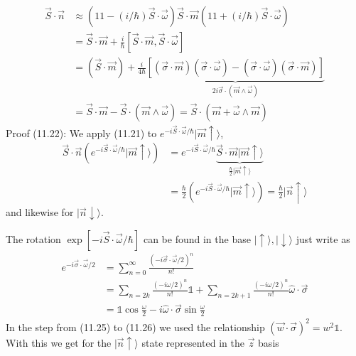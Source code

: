 \begin{equation}
\begin{aligned} \vec{S} \cdot \vec{n} & \approx(11-(i / \hbar) \vec{S} \cdot \vec{\omega}) \vec{S} \cdot \vec{m}(11+(i / \hbar) \vec{S} \cdot \vec{\omega}) \\ &=\vec{S} \cdot \vec{m}+\frac{i}{\hbar}[\vec{S} \cdot \vec{m}, \vec{S} \cdot \vec{\omega}] \\ &=(\vec{S} \cdot \vec{m})+\frac{i}{4 \hbar} \underbrace{[(\vec{\sigma} \cdot \vec{m})(\vec{\sigma} \cdot \vec{\omega})-(\vec{\sigma} \cdot \vec{\omega})(\vec{\sigma} \cdot \vec{m})]}_{2 i \vec{\sigma} \cdot(\vec{m} \wedge \vec{\omega})} \\ &=\vec{S} \cdot \vec{m}-\vec{S} \cdot(\vec{m} \wedge \vec{\omega})=\vec{S} \cdot(\vec{m}+\vec{\omega} \wedge \vec{m}) \end{aligned}
\end{equation}
Proof (11.22): We apply (11.21) to $e^{-i \vec{S} \cdot \vec{\omega} / \hbar}|\vec{m} \uparrow\rangle$,
\begin{equation}
\begin{aligned} \vec{S} \cdot \vec{n}\left(e^{-i \vec{S} \cdot \vec{\omega} / \hbar}|\vec{m} \uparrow\rangle\right) &=e^{-i \vec{S} \cdot \vec{\omega} / \hbar} \underbrace{\vec{S} \cdot \vec{m}|\vec{m} \uparrow\rangle}_{\frac{\hbar}{2}|\vec{m} \uparrow\rangle} \\ &=\frac{\hbar}{2}\left(e^{-i \vec{S} \cdot \vec{\omega} / \hbar}|\vec{m} \uparrow\rangle\right)=\frac{\hbar}{2}|\vec{n} \uparrow\rangle \end{aligned}
\end{equation}
and likewise for $|\vec{n}\downarrow\rangle$.\par
The rotation $\exp [-i \vec{S} \cdot \vec{\omega} / \hbar]$ can be found in the base $|\uparrow\rangle,|\downarrow\rangle$ just write as
\begin{align} e^{-i \vec{\sigma} \cdot \vec{\omega} / 2} &=\sum_{n=0}^{\infty} \frac{(-i \vec{\sigma} \cdot \vec{\omega} / 2)^{n}}{n !} \\ &=\sum_{n=2 k} \frac{(-i \omega / 2)^{n}}{n !} \mathbb{1}+\sum_{n=2 k+1} \frac{(-i \omega / 2)^{n}}{n !} \hat{\omega} \cdot \vec{\sigma} \\
&=\mathbb{1} \cos \frac{\omega}{2}-i \hat{\omega} \cdot \vec{\sigma} \sin \frac{\omega}{2}
\end{align}
In the step from (11.25) to (11.26) we used the relationship $(\vec{w}\cdot\vec{\sigma})^2=w^2\mathbb{1}$. With this we get for the $|\vec{n}\uparrow\rangle$ state represented in the $\vec{z}$ basis
